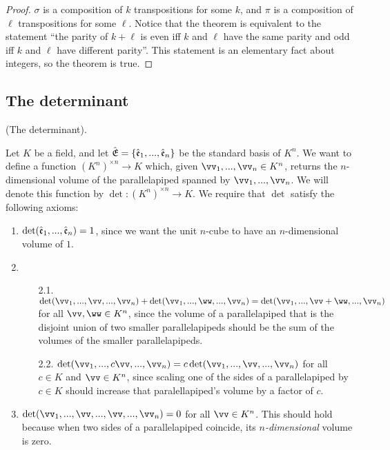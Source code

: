 \begin{proof}
    $\sigma$ is a composition of $k$ transpositions for some $k$, and $\pi$ is a composition of $\ell$ transpositions for some $\ell$. Notice that the theorem is equivalent to the statement ``the parity of $k + \ell$ is even iff $k$ and $\ell$ have the same parity and odd iff $k$ and $\ell$ have different parity''. This statement is an elementary fact about integers, so the theorem is true.
\end{proof}

\subsection*{The determinant}

\begin{defn}
\label{ch::lin_alg::defn::determinant}
    (The determinant).
    
    Let $K$ be a field, and let ${\hat{\mathfrak{E}}} = \{\hat{\mathfrak{e}}_1, ..., \hat{\mathfrak{e}}_n\}$ be the standard basis of $K^n$. We want to define a function $(K^n)^{\times n} \rightarrow K$ which, given $\vv_1, ..., \vv_n \in K^n$, returns the $n$-dimensional volume of the parallelapiped spanned by $\vv_1, ..., \vv_n$. We will denote this function by $\det:(K^n)^{\times n} \rightarrow K$. We require that $\det$ satisfy the following axioms:
    
    \begin{enumerate}
        \item $\det(\hat{\mathfrak{e}}_1, ..., \hat{\mathfrak{e}}_n) = 1$, since we want the unit $n$-cube to have an $n$-dimensional volume of $1$.
        \item
        \begin{enumerate}
            \item[2.1.]
            $\det(\vv_1, ..., \vv, ..., \vv_n) + \det(\vv_1, ..., \ww, ..., \vv_n) = \det(\vv_1, ..., \vv + \ww, ..., \vv_n)$ for all $\vv, \ww \in K^n$, since the volume of a parallelapiped that is the disjoint union of two smaller parallelapipeds should be the sum of the volumes of the smaller parallelapipeds.
            \item[2.2.] $\det(\vv_1, ..., c\vv, ..., \vv_n) = c\det(\vv_1, ..., \vv, ..., \vv_n)$ for all $c \in K$ and $\vv \in K^n$, since scaling one of the sides of a parallelapiped by $c \in K$ should increase that paralellapiped's volume by a factor of $c$. 
        \end{enumerate}
        \item $\det(\vv_1, ..., \vv, ..., \vv, ..., \vv_n) = 0$ for all $\vv \in K^n$. This should hold because when two sides of a parallelapiped coincide, its \textit{$n$-dimensional} volume is zero.
    \end{enumerate}
\end{defn}

